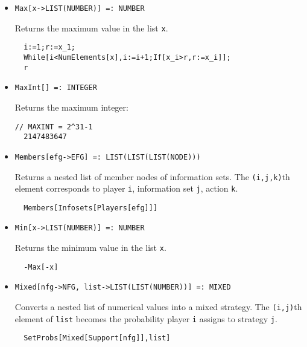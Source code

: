 \begin{itemize}
\item{}
\protect \large \begin{verbatim}
Max[x->LIST(NUMBER)] =: NUMBER 
\end{verbatim}\normalsize

\bd 
Returns the maximum value in the list \verb+x+.  
\begin{verbatim}
  i:=1;r:=x_1;
  While[i<NumElements[x],i:=i+1;If[x_i>r,r:=x_i]];
  r
\end{verbatim} 
\ed


\item{}
\protect \large \begin{verbatim}
MaxInt[] =: INTEGER 
\end{verbatim}\normalsize

\bd 
Returns the maximum integer:
\begin{verbatim}
// MAXINT = 2^31-1
  2147483647
\end{verbatim} 
\ed

\item{}
\protect \large \begin{verbatim}
Members[efg->EFG] =: LIST(LIST(LIST(NODE))) 
\end{verbatim}\normalsize

\bd 
Returns a nested list of member nodes of information sets.  The
\verb+(i,j,k)+th element corresponds to player \verb+i+, information
set \verb+j+, action \verb+k+.  
\begin{verbatim}
  Members[Infosets[Players[efg]]]
\end{verbatim} 
\ed

\item{}
\protect \large \begin{verbatim}
Min[x->LIST(NUMBER)] =: NUMBER 
\end{verbatim}\normalsize

\bd 
Returns the minimum value in the list \verb+x+.  
\begin{verbatim}
  -Max[-x]
\end{verbatim} 
\ed

\item{}
\protect \large \begin{verbatim}
Mixed[nfg->NFG, list->LIST(LIST(NUMBER))] =: MIXED 
\end{verbatim}\normalsize

\bd 
Converts a nested list of numerical values into a mixed strategy.  The
\verb+(i,j)+th element of \verb+list+ becomes the probability
player \verb+i+ assigns to strategy \verb+j+. 
\begin{verbatim}
  SetProbs[Mixed[Support[nfg]],list]
\end{verbatim} 
\ed


\end{itemize}
